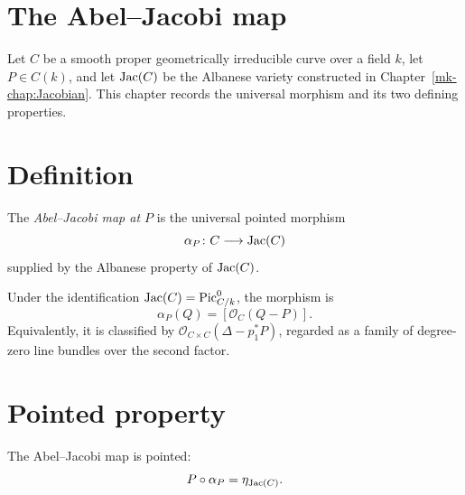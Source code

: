 \section{The Abel--Jacobi map}
\label{mk-chap:AbelJacobi}

Let \(C\) be a smooth proper geometrically irreducible curve over a field \(k\),
let \(P \in C(k)\), and let \(\mathrm{Jac}(C)\) be the Albanese variety constructed in
Chapter~\ref{mk-chap:Jacobian}.  This chapter records the universal morphism and its
two defining properties.

\section{Definition}

\begin{definition}\label{mk-def:ofCurve}
  \leanok

  The \emph{Abel--Jacobi map at \(P\)} is the universal pointed morphism
  \[
    \alpha_P \colon C \longrightarrow \mathrm{Jac}(C)
  \]
  supplied by the Albanese property of \(\mathrm{Jac}(C)\).
\end{definition}

\begin{remark}
  \label{mk-rem:ofCurve_classical}
  Under the identification \(\mathrm{Jac}(C) = \operatorname{Pic}^0_{C/k}\), the morphism is
  \[
    \alpha_P(Q) = [\mathcal O_C(Q-P)].
  \]
  Equivalently, it is classified by
  \(\mathcal O_{C\times C}(\Delta-p_1^*P)\), regarded as a family of
  degree-zero line bundles over the second factor.
\end{remark}

\section{Pointed property}

\begin{lemma}\label{mk-lem:comp_ofCurve}
  \leanok

  The Abel--Jacobi map is pointed:
  \[
    P \circ \alpha_P = \eta_{\mathrm{Jac}(C)}.
  \]
\end{lemma}

